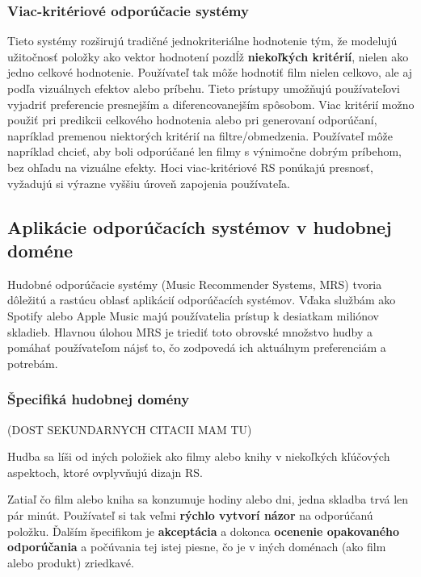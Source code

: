 \subsubsection{Viac-kritériové odporúčacie systémy}

Tieto systémy rozširujú tradičné jednokriteriálne hodnotenie tým, že modelujú užitočnosť položky ako vektor hodnotení pozdĺž \textbf{niekoľkých kritérií}, nielen ako jedno celkové hodnotenie.\cite{Ricci} Používateľ tak môže hodnotiť film nielen celkovo, ale aj podľa vizuálnych efektov alebo príbehu. Tieto prístupy umožňujú používateľovi vyjadriť preferencie presnejším a diferencovanejším spôsobom.\cite{Ricci}
Viac kritérií možno použiť pri predikcii celkového hodnotenia alebo pri generovaní odporúčaní, napríklad premenou niektorých kritérií na filtre/obmedzenia. Používateľ môže napríklad chcieť, aby boli odporúčané len filmy s výnimočne dobrým príbehom, bez ohľadu na vizuálne efekty.\cite{Ricci}
Hoci viac-kritériové RS ponúkajú presnosť, vyžadujú si výrazne vyššiu úroveň zapojenia používateľa.

\subsection{Aplikácie odporúčacích systémov v hudobnej doméne}
Hudobné odporúčacie systémy (Music Recommender Systems, MRS) tvoria dôležitú a rastúcu oblasť aplikácií odporúčacích systémov. Vďaka službám ako Spotify alebo Apple Music majú používatelia prístup k desiatkam miliónov skladieb. Hlavnou úlohou MRS je triediť toto obrovské množstvo hudby a pomáhať používateľom nájsť to, čo zodpovedá ich aktuálnym preferenciám a potrebám.\cite{Ricci, challenges}

\subsubsection{Špecifiká hudobnej domény}
(DOST SEKUNDARNYCH CITACII MAM TU)

Hudba sa líši od iných položiek ako filmy alebo knihy v niekoľkých kľúčových aspektoch, ktoré ovplyvňujú dizajn RS.

Zatiaľ čo film alebo kniha sa konzumuje hodiny alebo dni, jedna skladba trvá len pár minút. Používateľ si tak veľmi \textbf{rýchlo vytvorí názor} na odporúčanú položku. Ďalším špecifikom je \textbf{akceptácia} a dokonca \textbf{ocenenie opakovaného odporúčania} a počúvania tej istej piesne, čo je v iných doménach (ako film alebo produkt) zriedkavé.\cite{Ricci, challenges}

